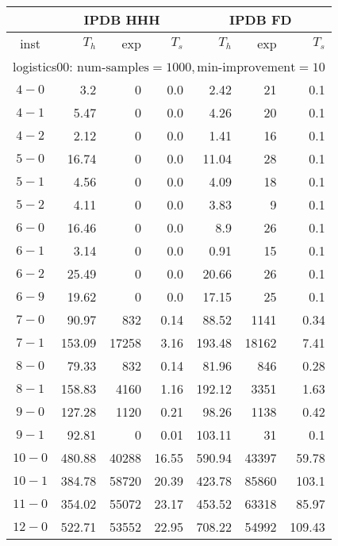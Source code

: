 \begin{longtable}{|c||r|r|r||r|r|r|}\firsthline
& \multicolumn{3}{c||}{IPDB HHH} & \multicolumn{3}{c||}{IPDB FD}\\\hline
inst & $T_h$ & exp & $T_s$ & $T_h$ & exp & $T_s$\\\hline
\multicolumn{7}{|l|}{logistics00: $\text{num-samples}=1000,\text{min-improvement}=10$}\\\hline
$4-0$ & 3.2 & 0 & 0.0 & 2.42 & 21 & 0.1 \\\hline
$4-1$ & 5.47 & 0 & 0.0 & 4.26 & 20 & 0.1 \\\hline
$4-2$ & 2.12 & 0 & 0.0 & 1.41 & 16 & 0.1 \\\hline
$5-0$ & 16.74 & 0 & 0.0 & 11.04 & 28 & 0.1 \\\hline
$5-1$ & 4.56 & 0 & 0.0 & 4.09 & 18 & 0.1 \\\hline
$5-2$ & 4.11 & 0 & 0.0 & 3.83 & 9 & 0.1 \\\hline
$6-0$ & 16.46 & 0 & 0.0 & 8.9 & 26 & 0.1 \\\hline
$6-1$ & 3.14 & 0 & 0.0 & 0.91 & 15 & 0.1 \\\hline
$6-2$ & 25.49 & 0 & 0.0 & 20.66 & 26 & 0.1 \\\hline
$6-9$ & 19.62 & 0 & 0.0 & 17.15 & 25 & 0.1 \\\hline
$7-0$ & 90.97 & 832 & 0.14 & 88.52 & 1141 & 0.34 \\\hline
$7-1$ & 153.09 & 17258 & 3.16 & 193.48 & 18162 & 7.41 \\\hline
$8-0$ & 79.33 & 832 & 0.14 & 81.96 & 846 & 0.28 \\\hline
$8-1$ & 158.83 & 4160 & 1.16 & 192.12 & 3351 & 1.63 \\\hline
$9-0$ & 127.28 & 1120 & 0.21 & 98.26 & 1138 & 0.42 \\\hline
$9-1$ & 92.81 & 0 & 0.01 & 103.11 & 31 & 0.1 \\\hline
$10-0$ & 480.88 & 40288 & 16.55 & 590.94 & 43397 & 59.78 \\\hline
$10-1$ & 384.78 & 58720 & 20.39 & 423.78 & 85860 & 103.1 \\\hline
$11-0$ & 354.02 & 55072 & 23.17 & 453.52 & 63318 & 85.97 \\\hline
$12-0$ & 522.71 & 53552 & 22.95 & 708.22 & 54992 & 109.43 \\\hline


\end{longtable}
